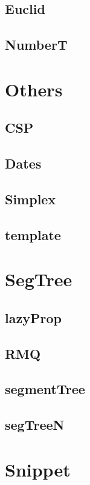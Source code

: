 \documentclass[a4paper, twocolumn]{article}
\begin{document}
\subsection{Euclid}

\subsection{NumberT}

\section{Others}
\subsection{CSP}

\subsection{Dates}

\subsection{Simplex}

\subsection{template}

\section{SegTree}
\subsection{lazyProp}

\subsection{RMQ}

\subsection{segmentTree}

\subsection{segTreeN}

\section{Snippet}
\end{document}
